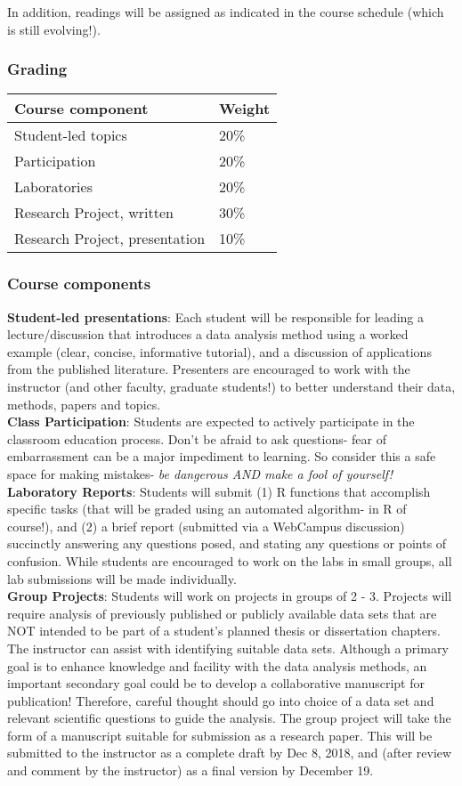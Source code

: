 \documentclass[]{article}
\begin{document}
In addition, readings will be assigned as indicated in the course
schedule (which is still evolving!).

\subsubsection{Grading}\label{grading}

\begin{longtable}[]{@{}ll@{}}
\toprule
Course component & Weight\tabularnewline
\midrule
\endhead
Student-led topics & 20\%\tabularnewline
Participation & 20\%\tabularnewline
Laboratories & 20\%\tabularnewline
Research Project, written & 30\%\tabularnewline
Research Project, presentation & 10\%\tabularnewline
\bottomrule
\end{longtable}

\subsubsection{Course components}\label{course-components}

\textbf{Student-led presentations}: Each student will be responsible for
leading a lecture/discussion that introduces a data analysis method
using a worked example (clear, concise, informative tutorial), and a
discussion of applications from the published literature. Presenters are
encouraged to work with the instructor (and other faculty, graduate
students!) to better understand their data, methods, papers and
topics.\\
\textbf{Class Participation}: Students are expected to actively
participate in the classroom education process. Don't be afraid to ask
questions- fear of embarrassment can be a major impediment to learning.
So consider this a safe space for making mistakes- \emph{be dangerous
AND make a fool of yourself!}\\
\textbf{Laboratory Reports}: Students will submit (1) R functions that
accomplish specific tasks (that will be graded using an automated
algorithm- in R of course!), and (2) a brief report (submitted via a
WebCampus discussion) succinctly answering any questions posed, and
stating any questions or points of confusion. While students are
encouraged to work on the labs in small groups, all lab submissions will
be made individually.\\
\textbf{Group Projects}: Students will work on projects in groups of 2 -
3. Projects will require analysis of previously published or publicly
available data sets that are NOT intended to be part of a student's
planned thesis or dissertation chapters. The instructor can assist with
identifying suitable data sets. Although a primary goal is to enhance
knowledge and facility with the data analysis methods, an important
secondary goal could be to develop a collaborative manuscript for
publication! Therefore, careful thought should go into choice of a data
set and relevant scientific questions to guide the analysis. The group
project will take the form of a manuscript suitable for submission as a
research paper. This will be submitted to the instructor as a complete
draft by Dec 8, 2018, and (after review and comment by the instructor)
as a final version by December 19.
\end{document}

